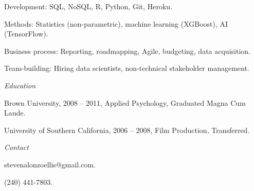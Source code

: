 \documentclass[12pt]{res}
\begin{document}
{\begin{resume}
\begin{list}{}{\leftmargin=1em}
{\item
\begin{list}{-}{\leftmargin=1em}
\item Development: SQL, NoSQL, R, Python, Git, Heroku.
\item Methods: Statistics (non-parametric), machine learning (XGBoost), AI (TensorFlow).
\item Business process: Reporting, roadmapping, Agile, budgeting, data acquisition. 
\item Team-building: Hiring data scientists, non-technical stakeholder management.
\end{list}}
\item
\item{\centering \textit{Education}
\item 
\item
\begin{list}{-}{\leftmargin=1em}
\item Brown University, 2008 -- 2011, Applied Psychology, Graduated Magna Cum Laude. 
\item University of Southern California, 2006 -- 2008, Film Production, Transferred. 
\end{list}}
\item
\item{\centering \textit{Contact}
\item 
\item
\begin{list}{-}{\leftmargin=1em}
\item stevenalonzoellis@gmail.com.
\item (240) 441-7803.
\end{list}}
\item
\end{list}
\end{resume}
} %
\end{document}
